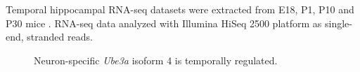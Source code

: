 Temporal hippocampal RNA-seq datasets were extracted from E18, P1, P10 and P30 mice \cite{You2015}. RNA-seq data analyzed with Illumina HiSeq 2500 platform as single-end, stranded reads.

\begin{figure}
  \centering
  \caption{Neuron-specific \textit{Ube3a} isoform 4 is temporally regulated.}
  \label{temporal sense expression}
\end{figure}
